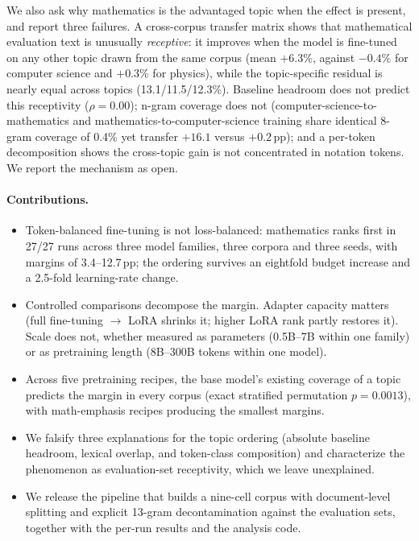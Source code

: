 \documentclass[11pt]{article}
\begin{document}
We also ask why mathematics is the advantaged topic when the effect is
present, and report three failures. A cross-corpus transfer matrix shows
that mathematical evaluation text is unusually \emph{receptive}: it improves
when the model is fine-tuned on any other topic drawn from the same corpus
(mean $+6.3\%$, against $-0.4\%$ for computer science and $+0.3\%$ for
physics), while the topic-specific residual is nearly equal across topics
(13.1/11.5/12.3\%). Baseline headroom does not predict this receptivity
($\rho{=}0.00$); n-gram coverage does not (computer-science-to-mathematics
and mathematics-to-computer-science training share identical 8-gram
coverage of 0.4\% yet transfer $+16.1$ versus $+0.2$\,pp); and a per-token
decomposition shows the cross-topic gain is not concentrated in notation
tokens. We report the mechanism as open.

\paragraph{Contributions.}
\begin{itemize}
  \item Token-balanced fine-tuning is not loss-balanced: mathematics ranks
  first in 27/27 runs across three model families, three corpora and three
  seeds, with margins of 3.4--12.7\,pp; the ordering survives an eightfold
  budget increase and a 2.5-fold learning-rate change.
  \item Controlled comparisons decompose the margin. Adapter capacity
  matters (full fine-tuning $\to$ LoRA shrinks it; higher LoRA rank
  partly restores it). Scale does not, whether measured as parameters
  (0.5B--7B within one family) or as pretraining length (8B--300B tokens
  within one model).
  \item Across five pretraining recipes, the base model's existing
  coverage of a topic predicts the margin in every corpus (exact stratified
  permutation $p{=}0.0013$), with math-emphasis recipes producing the
  smallest margins.
  \item We falsify three explanations for the topic ordering (absolute
  baseline headroom, lexical overlap, and token-class composition) and
  characterize the phenomenon as evaluation-set receptivity, which we leave
  unexplained.
  \item We release the pipeline that builds a nine-cell corpus with document-level splitting and explicit 13-gram decontamination against the evaluation sets, together with the per-run results and the analysis code.
\end{itemize}
\end{document}
